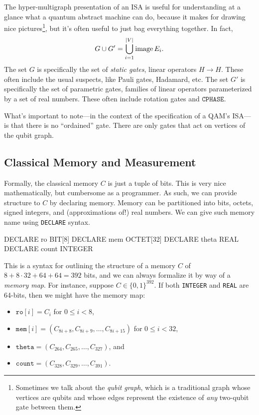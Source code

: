 The hyper-multigraph presentation of an ISA is useful for understanding at a glance what a quantum abstract machine can do, because it makes for drawing nice pictures\footnote{Sometimes we talk about the \emph{qubit graph}, which is a traditional graph whose vertices are qubits and whose edges represent the existence of \emph{any} two-qubit gate between them.}, but it's often useful to just bag everything together. In fact,
\begin{equation}
    G \cup G' = \bigcup_{i=1}^{\vert V\vert} \operatorname{image} E_i.
\end{equation}
The set $G$ is specifically the set of \emph{static gates}, linear operators $H\to H$. These often include the usual suspects, like Pauli gates, Hadamard, etc. The set $G'$ is specifically the set of parametric gates, families of linear operators parameterized by a set of real numbers. These often include rotation gates and $\mathtt{CPHASE}$.

What's important to note---in the context of the specification of a QAM's ISA---is that there is no ``ordained'' \CNOT{} gate. There are only \CNOT{} gates that act on vertices of the qubit graph.

\subsection{Classical Memory and Measurement}

Formally, the classical memory $C$ is just a tuple of bits. This is very nice mathematically, but cumbersome as a programmer. As such, we can provide structure to $C$ by declaring memory. Memory can be partitioned into bits, octets, signed integers, and (approximations of!) real numbers. We can give such memory name using \verb|DECLARE| syntax.

\begin{quil}
DECLARE ro BIT[8]
DECLARE mem OCTET[32]
DECLARE theta REAL
DECLARE count INTEGER
\end{quil}

This is a syntax for outlining the structure of a memory $C$ of $8+8\cdot 32+64+64=392$ bits, and we can always formalize it by way of a \emph{memory map}. For instance, suppose $C\in\{0,1\}^{392}$. If both \verb|INTEGER| and \verb|REAL| are 64-bits, then we might have the memory map:
\begin{itemize}
    \item $\texttt{ro}[i] = C_i$ for $0 \leq i < 8$,
    \item $\texttt{mem}[i] = (C_{8i+8}, C_{8i+9}, \ldots, C_{8i+15})$ for $0\leq i < 32$,
    \item $\texttt{theta} = (C_{264}, C_{265}, \ldots, C_{327})$, and
    \item $\texttt{count} = (C_{328}, C_{329}, \ldots, C_{391})$.
\end{itemize}

